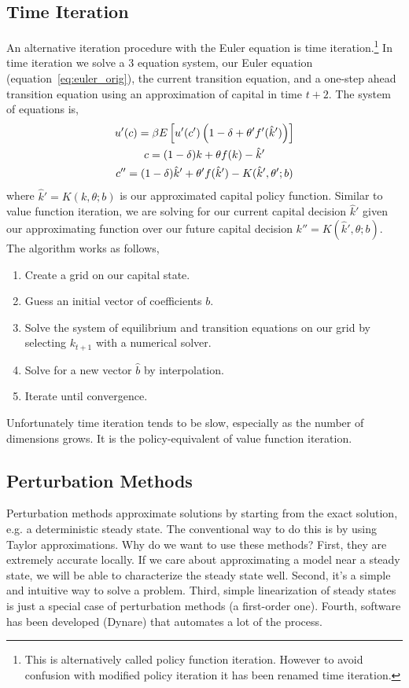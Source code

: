 \documentclass[11pt]{article}%
\begin{document}
\subsection{Time Iteration}
An alternative iteration procedure with the Euler equation is time iteration.\footnote{This is alternatively called policy function iteration. However to avoid confusion with modified policy iteration it has been renamed time iteration.} In time iteration we solve a 3 equation system, our Euler equation (equation~\ref{eq:euler_orig}), the current transition equation, and a one-step ahead transition equation using an approximation of capital in time $t+2$. The system of equations is,
\begin{gather}
	u'(c) = \beta E\left[u'(c')\left( 1 - \delta + \theta'f'(\hat{k}') \right) \right] \notag\\
	c = (1-\delta)k + \theta f(k) - \hat{k}' \notag \\
	c'' = (1-\delta)\hat{k}' + \theta'f(\hat{k}') - K(\hat{k}',\theta';b) \notag
\end{gather}
where $\hat{k}' = K(k,\theta;b)$ is our approximated capital policy function. Similar to value function iteration, we are solving for our current capital decision $\hat{k}'$ given our approximating function over our future capital decision $k'' = K(\hat{k}',\theta;b)$. The algorithm works as follows,
\begin{enumerate}
	\item Create a grid on our capital state.
	\item Guess an initial vector of coefficients $b$.
	\item Solve the system of equilibrium and transition equations on our grid by selecting $k_{t+1}$ with a numerical solver.
	\item Solve for a new vector $\hat{b}$ by interpolation.
	\item Iterate until convergence.
\end{enumerate}
Unfortunately time iteration tends to be slow, especially as the number of dimensions grows. It is the policy-equivalent of value function iteration.

\subsection{Perturbation Methods}
Perturbation methods approximate solutions by starting from the exact solution, e.g. a deterministic steady state. The conventional way to do this is by using Taylor approximations. Why do we want to use these methods? First, they are extremely accurate locally. If we care about approximating a model near a steady state, we will be able to characterize the steady state well. Second, it's a simple and intuitive way to solve a problem. Third, simple linearization of steady states is just a special case of perturbation methods (a first-order one). Fourth, software has been developed (Dynare) that automates a lot of the process.




{}
\end{document}
